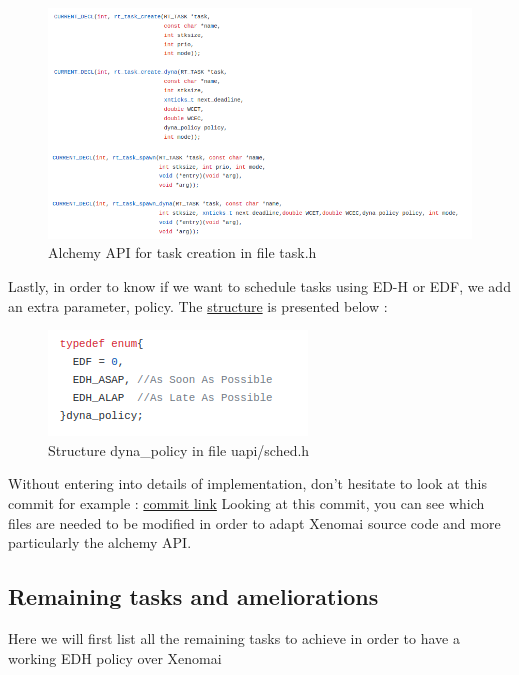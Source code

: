 \documentclass[12pt,hidelinks]{article}
\begin{document}
{\begin{itemize}
	     \begin{figure}[!h]
        \centering
    	\includegraphics[scale=0.6]{alchemyAPI.png}
    	\caption{Alchemy API for task creation in file task.h}
    	\end{figure} \newline
	    
	    Lastly, in order to know if we want to schedule tasks using ED-H or EDF, we add an extra parameter, policy. The \href{https://github.com/skyultime/Xenomai-EDH/blob/final_version/include/cobalt/uapi/sched.h}{structure} is presented below :
	    
	     \begin{figure}[!h]
        \centering
    	\includegraphics[scale=1]{dyna_policy.png}
    	\caption{Structure dyna\_policy in file uapi/sched.h}
    	\end{figure} \newline
	    
	\end{itemize}
	
	Without entering into details of implementation, don't hesitate to look at this commit for example : \href{https://github.com/skyultime/Xenomai-EDH/commit/f339c141faf314a96725899d3941c65e162457d1}{commit link}
	Looking at this commit, you can see which files are needed to be modified in order to adapt Xenomai source code and more particularly the alchemy API.  
	
	\newpage \subsection{Remaining tasks and ameliorations} \label{remaining}
	Here we will first list all the remaining tasks to achieve in order to have a working EDH policy over Xenomai
	\begin{itemize}
	    

\end{itemize}}
\end{document}
